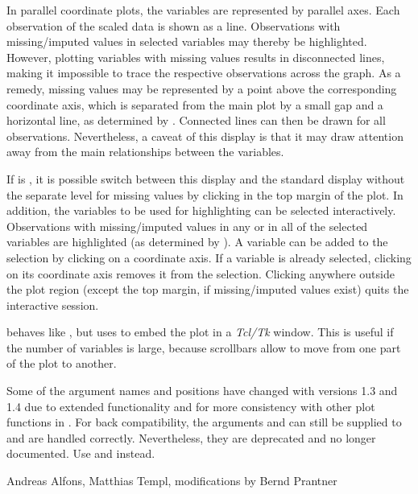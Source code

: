 \begin{Details}\relax
In parallel coordinate plots, the variables are represented by parallel 
axes.  Each observation of the scaled data is shown as a line.  Observations 
with missing/imputed values in selected variables may thereby be highlighted.  
However, plotting variables with missing values results in disconnected 
lines, making it impossible to trace the respective observations across 
the graph.  As a remedy, missing values may be represented by a point above 
the corresponding coordinate axis, which is separated from the main plot by a 
small gap and a horizontal line, as determined by .  Connected 
lines can then be drawn for all observations.  Nevertheless, a caveat of this 
display is that it may draw attention away from the main relationships 
between the variables.

If  is , it is possible switch between this 
display and the standard display without the separate level for missing 
values by clicking in the top margin of the plot. In addition, the variables 
to be used for highlighting can be selected interactively.  Observations with 
missing/imputed values in any or in all of the selected variables are highlighted (as 
determined by ).  A variable can be added to the selection by 
clicking on a coordinate axis.  If a variable is already selected, clicking 
on its coordinate axis removes it from the selection.  Clicking anywhere 
outside the plot region (except the top margin, if missing/imputed values exist) 
quits the interactive session.

 behaves like , but uses 
 to embed the plot in a \emph{Tcl/Tk} window.  
This is useful if the number of variables is large, because scrollbars allow 
to move from one part of the plot to another. 
\end{Details}
%
\begin{Note}\relax
Some of the argument names and positions have changed with versions 1.3 and 
1.4 due to extended functionality and for more consistency with other plot 
functions in .  For back compatibility, the arguments 
 and  can still be supplied to  
and are handled correctly.  Nevertheless, they are deprecated and no longer 
documented.  Use  and  instead.
\end{Note}
%
\begin{Author}\relax
Andreas Alfons, Matthias Templ, modifications by Bernd Prantner
\end{Author}
